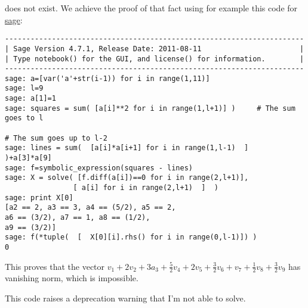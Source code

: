 does not exist. We achieve the proof of that fact using for example this code for \href{http://www.sagemath.org}{sage}:
\begin{verbatim}
----------------------------------------------------------------------
| Sage Version 4.7.1, Release Date: 2011-08-11                       |
| Type notebook() for the GUI, and license() for information.        |
----------------------------------------------------------------------
sage: a=[var('a'+str(i-1)) for i in range(1,11)]
sage: l=9
sage: a[1]=1
sage: squares = sum( [a[i]**2 for i in range(1,l+1)] )     # The sum goes to l

# The sum goes up to l-2
sage: lines = sum(  [a[i]*a[i+1] for i in range(1,l-1)  ]   )+a[3]*a[9]  
sage: f=symbolic_expression(squares - lines)
sage: X = solve( [f.diff(a[i])==0 for i in range(2,l+1)],
                [ a[i] for i in range(2,l+1)  ]  )
sage: print X[0]
[a2 == 2, a3 == 3, a4 == (5/2), a5 == 2, 
a6 == (3/2), a7 == 1, a8 == (1/2), 
a9 == (3/2)]
sage: f(*tuple(  [  X[0][i].rhs() for i in range(0,l-1)]) )
0
\end{verbatim}
This proves that the vector \( v_1+2v_2+3a_3+\frac{ 5 }{2}v_4+2v_5+\frac{ 3 }{2}v_6+v_7+\frac{ 1 }{2}v_8+\frac{ 3 }{2}v_9\) has vanishing norm, which is impossible.

\begin{probleme}
	This code raises a deprecation warning that I'm not able to solve.
\end{probleme}

